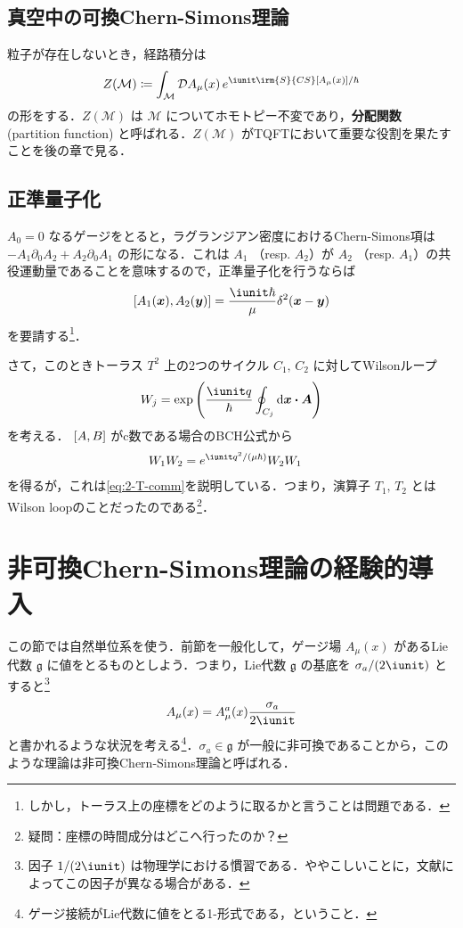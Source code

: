 \documentclass[TQFT_main]{subfiles}
\begin{document}
\subsection{真空中の可換Chern-Simons理論}

粒子が存在しないとき，経路積分は
\begin{align}
    Z(\mathcal{M}) \coloneqq \int_{\mathcal{M}} \mathcal{D} A_\mu (x)\, e^{\iunit \irm{S}{CS}[A_\mu (x)]/\hbar}
\end{align}
の形をする．$Z(\mathcal{M})$ は $\mathcal{M}$ についてホモトピー不変であり，\textbf{分配関数} (partition function) と呼ばれる．$Z(\mathcal{M})$ がTQFTにおいて重要な役割を果たすことを後の章で見る．

\subsection{正準量子化}

$A_0 = 0$ なるゲージをとると，ラグランジアン密度におけるChern-Simons項は $-A_1 \partial_0 A_2 + A_2 \partial_0 A_1$ の形になる．これは $A_1$ （resp. $A_2$）が $A_2$ （resp. $A_1$）の共役運動量であることを意味するので，正準量子化を行うならば
\begin{align}
    \comm{A_1(\bm{x})}{A_2(\bm{y})} = \frac{\iunit \hbar}{\mu} \delta^2 (\bm{x} - \bm{y})
\end{align}
を要請する\footnote{しかし，トーラス上の座標をどのように取るかと言うことは問題である．}．

さて，このときトーラス $T^2$ 上の2つのサイクル $C_1,\, C_2$ に対してWilsonループ
\begin{align}
    W_j = \exp \left( \frac{\iunit q}{\hbar} \oint_{C_j} \dd{\bm{x}} \vdot \bm{A} \right) 
\end{align}
を考える．
$\comm{A}{B}$ がc数である場合のBCH公式から
\begin{align}
    W_1 W_2 &= e^{\iunit q^2 / (\mu \hbar)} W_2 W_1
\end{align}
を得るが，これは\eqref{eq:2-T-comm}を説明している．つまり，演算子 $T_1,\, T_2$ とはWilson loopのことだったのである\footnote{疑問：座標の時間成分はどこへ行ったのか？}．

\section{非可換Chern-Simons理論の経験的導入}

この節では自然単位系を使う．前節を一般化して，ゲージ場 $A_\mu (x)$ があるLie代数 $\mathfrak{g}$ に値をとるものとしよう．つまり，Lie代数 $\mathfrak{g}$ の基底を $\sigma_a / (2\iunit)$ とすると\footnote{因子 $1/(2\iunit)$ は物理学における慣習である．ややこしいことに，文献によってこの因子が異なる場合がある．}
\begin{align}
    A_\mu (x) = A_\mu^a (x) \frac{\sigma_a}{2\iunit}
\end{align}
と書かれるような状況を考える\footnote{ゲージ接続がLie代数に値をとる1-形式である，ということ．}．$\sigma_a \in \mathfrak{g}$ が一般に非可換であることから，このような理論は非可換Chern-Simons理論と呼ばれる．
\end{document}
